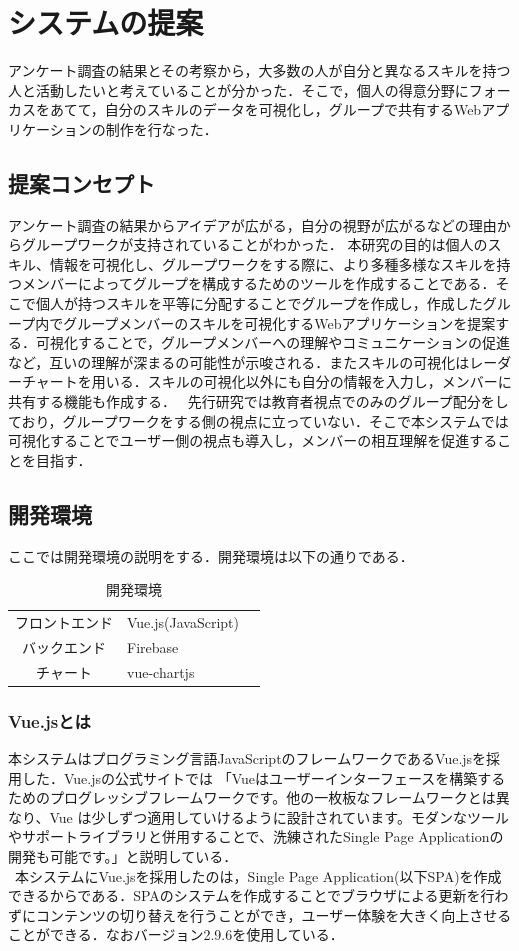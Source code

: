 \documentclass{funthesis}
\begin{document}
\chapter{システムの提案}
アンケート調査の結果とその考察から，大多数の人が自分と異なるスキルを持つ人と活動したいと考えていることが分かった．そこで，個人の得意分野にフォーカスをあてて，自分のスキルのデータを可視化し，グループで共有するWebアプリケーションの制作を行なった．

\section{提案コンセプト}
アンケート調査の結果からアイデアが広がる，自分の視野が広がるなどの理由からグループワークが支持されていることがわかった．
本研究の目的は個人のスキル、情報を可視化し、グループワークをする際に、より多種多様なスキルを持つメンバーによってグループを構成するためのツールを作成することである．そこで個人が持つスキルを平等に分配することでグループを作成し，作成したグループ内でグループメンバーのスキルを可視化するWebアプリケーションを提案する．可視化することで，グループメンバーへの理解やコミュニケーションの促進など，互いの理解が深まるの可能性が示唆される．またスキルの可視化はレーダーチャートを用いる．スキルの可視化以外にも自分の情報を入力し，メンバーに共有する機能も作成する．
\ 先行研究では教育者視点でのみのグループ配分をしており，グループワークをする側の視点に立っていない．そこで本システムでは可視化することでユーザー側の視点も導入し，メンバーの相互理解を促進することを目指す．
\section{開発環境}
ここでは開発環境の説明をする．開発環境は以下の通りである．
\begin{table}[h]
\begin{center}
  \begin{tabular}{cll} \hline
    フロントエンド & Vue.js(JavaScript)  \tabularnewline
    バックエンド& Firebase\tabularnewline
    チャート &vue-chartjs \tabularnewline
    \hline
  \end{tabular}
  \caption{開発環境}
  \label{開発環境}
  \end{center}
\end{table}

\subsection{Vue.jsとは}
本システムはプログラミング言語JavaScriptのフレームワークであるVue.jsを採用した．Vue.jsの公式サイトでは
「Vueはユーザーインターフェースを構築するためのプログレッシブフレームワークです。他の一枚板なフレームワークとは異なり、Vue は少しずつ適用していけるように設計されています。モダンなツールやサポートライブラリと併用することで、洗練されたSingle Page Applicationの開発も可能です。」\cite{A16}と説明している．\\
\ 本システムにVue.jsを採用したのは，Single Page Application(以下SPA)を作成できるからである．SPAのシステムを作成することでブラウザによる更新を行わずにコンテンツの切り替えを行うことができ，ユーザー体験を大きく向上させることができる．なおバージョン2.9.6を使用している．
\end{document}
